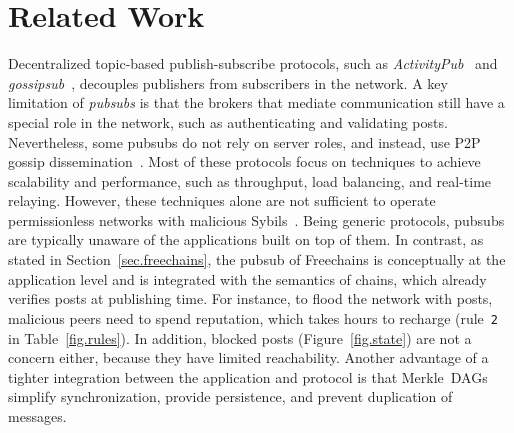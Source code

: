 \documentclass[12pt]{article}
\newcommand{\FC}       {Freechains\xspace}
\newcommand{\code}[1]  {\texttt{\footnotesize{#1}}}
\begin{document}
\section{Related Work}
\label{sec.related}



Decentralized topic-based publish-subscribe protocols, such as
    \emph{ActivityPub}~\cite{pubsub.activitypub} and
    \emph{gossipsub}~\cite{pubsub.gossipsub},
decouples publishers from subscribers in the network.
%
A key limitation of \emph{pubsubs} is that the brokers that mediate
communication still have a special role in the network, such as authenticating
and validating posts.
%
Nevertheless, some pubsubs do not rely on server roles, and instead, use
P2P gossip dissemination~\cite{pubsub.tera,pubsub.rappel,pubsub.gossipsub}.
Most of these protocols focus on techniques to achieve scalability and
performance, such as throughput, load balancing, and real-time relaying.
%
However, these techniques alone are not sufficient to operate permissionless
networks with malicious Sybils~\cite{pubsub.gossipsub2}.
Being generic protocols, pubsubs are typically unaware of the applications
built on top of them.
%
In contrast, as stated in Section~\ref{sec.freechains}, the pubsub of \FC is
conceptually at the application level and is integrated with the semantics of
chains, which already verifies posts at publishing time.
For instance, to flood the network with posts, malicious peers need to spend
reputation, which takes hours to recharge (rule~\code{2} in
Table~\ref{fig.rules}).
In addition, blocked posts (Figure~\ref{fig.state}) are not a concern either,
because they have limited reachability.
Another advantage of a tighter integration between the application and protocol
is that Merkle~DAGs simplify synchronization, provide persistence, and prevent
duplication of messages.
%
\end{document}
